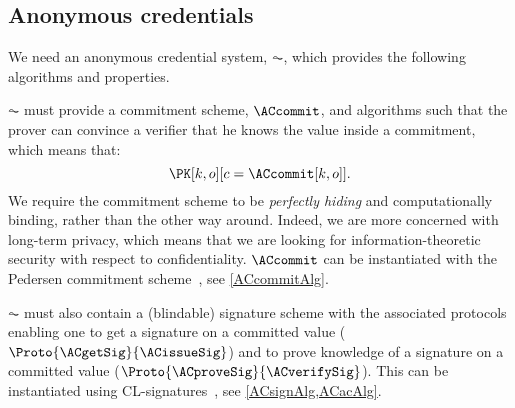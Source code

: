 \subsection{Anonymous credentials}%
\label{ZK-anon-cred}


We need an anonymous credential system, \(\AC\), which provides the following algorithms and properties.

\(\AC\) must provide a commitment scheme, \(\ACcommit\), and algorithms such that the prover can convince a verifier that he knows the value inside a commitment, which means that:
\begin{equation*}
  \PK[k, o][c = \ACcommit[k,o]].
\end{equation*}
We require the commitment scheme to be \emph{perfectly hiding} and computationally binding, rather than the other way around.
Indeed, we are more concerned with long-term privacy, which means that we are looking for information-theoretic security with respect to confidentiality.
\(\ACcommit\) can be instantiated with the Pedersen commitment 
scheme~\cite{PedersenCommitment}, see \cref{ACcommitAlg}.


\(\AC\) must also contain a (blindable) signature scheme with the associated 
protocols enabling one to get a signature on a committed value 
(\(\Proto{\ACgetSig}{\ACissueSig}\)) and to prove knowledge of a signature on a 
committed value (\(\Proto{\ACproveSig}{\ACverifySig}\)).
This can be instantiated using CL-signatures~\cite{CLsignatures}, see 
\cref{ACsignAlg,ACacAlg}.

